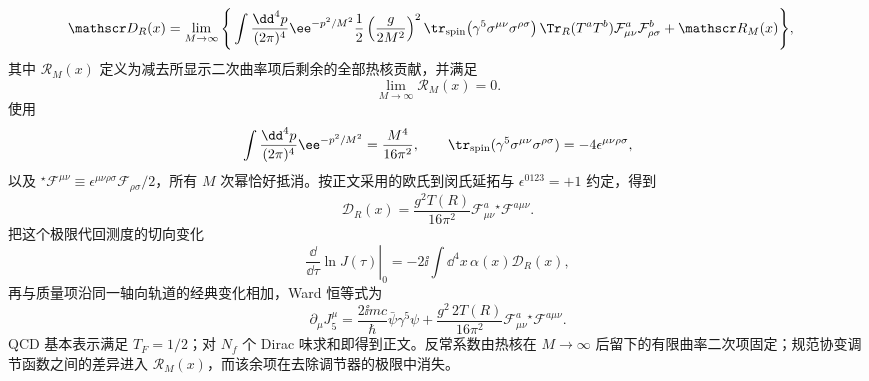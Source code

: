 \begin{derivation}
\begin{align*}
 \mathscr D_R(x)
 &=\lim_{M\to\infty}\Bigg\{
 \int\frac{\dd^4p}{(2\pi)^4}\ee^{-p^2/M^2}
 \frac12\left(\frac{g}{2M^2}\right)^2
 \tr_{\rm spin}\!\left(\gamma^5\sigma^{\mu\nu}\sigma^{\rho\sigma}\right)
 \Tr_R(T^aT^b)
 \mathcal F_{\mu\nu}^a\mathcal F_{\rho\sigma}^b
 +\mathscr R_M(x)\Bigg\},
\end{align*}
其中 $\mathscr R_M(x)$ 定义为减去所显示二次曲率项后剩余的全部热核贡献，并满足
\begin{equation*}
 \lim_{M\to\infty}\mathscr R_M(x)=0.
\end{equation*}
使用
\begin{equation*}
 \int\frac{\dd^4p}{(2\pi)^4}\ee^{-p^2/M^2}=\frac{M^4}{16\pi^2},
 \qquad
 \tr_{\rm spin}(\gamma^5\sigma^{\mu\nu}\sigma^{\rho\sigma})
 =-4\epsilon^{\mu\nu\rho\sigma},
\end{equation*}
以及 ${}^\star\!\mathcal F^{\mu\nu}\equiv\epsilon^{\mu\nu\rho\sigma}\mathcal F_{\rho\sigma}/2$，所有 $M$ 次幂恰好抵消。按正文采用的欧氏到闵氏延拓与 $\epsilon^{0123}=+1$ 约定，得到
\begin{equation*}
 \boxed{
 \mathscr D_R(x)
 =\frac{g^2T(R)}{16\pi^2}
 \mathcal F_{\mu\nu}^a{}^\star\!\mathcal F^{a\mu\nu}.}
\end{equation*}
把这个极限代回测度的切向变化
\begin{equation*}
 \left.\frac{\dd}{\dd\tau}\ln J(\tau)\right|_{0}
 =-2\ii\int\dd^4x\,\alpha(x)\mathscr D_R(x),
\end{equation*}
再与质量项沿同一轴向轨道的经典变化相加，Ward 恒等式为
\begin{equation*}
 \partial_\mu J_5^\mu
 =\frac{2\ii mc}{\hbar}\bar\psi\gamma^5\psi
 +\frac{g^2\,2T(R)}{16\pi^2}
 \mathcal F_{\mu\nu}^a{}^\star\!\mathcal F^{a\mu\nu}.
\end{equation*}
QCD 基本表示满足 $T_F=1/2$；对 $N_f$ 个 Dirac 味求和即得到正文。反常系数由热核在 $M\to\infty$ 后留下的有限曲率二次项固定；规范协变调节函数之间的差异进入 $\mathscr R_M(x)$，而该余项在去除调节器的极限中消失。
\end{derivation}

